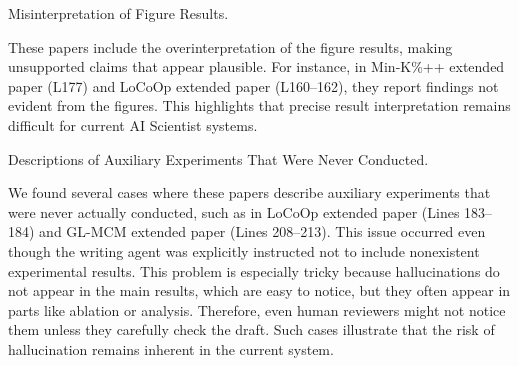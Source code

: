 \begin{tcolorbox}[colback=gray!10, colframe=gray!40!black, title=Issue3 :,breakable]
      Misinterpretation of Figure Results.
\end{tcolorbox}

These papers include the overinterpretation of the figure results, making unsupported claims that appear plausible.
For instance, in Min-K\%++ extended paper (L177) and LoCoOp extended paper (L160–162), they report findings not evident from the figures. This highlights that precise result interpretation remains difficult for current AI Scientist systems.

\begin{tcolorbox}[colback=gray!10, colframe=gray!40!black, title=Issue4 :,breakable]
    Descriptions of Auxiliary Experiments That Were Never Conducted.
\end{tcolorbox}

We found several cases where these papers describe auxiliary experiments that were never actually conducted, such as in LoCoOp extended paper (Lines 183–184) and GL-MCM extended paper (Lines 208–213).
This issue occurred even though the writing agent was explicitly instructed not to include nonexistent experimental results.
This problem is especially tricky because hallucinations do not appear in the main results, which are easy to notice, but they often appear in parts like ablation or analysis. Therefore, even human reviewers might not notice them unless they carefully check the draft.
Such cases illustrate that the risk of hallucination remains inherent in the current system.

